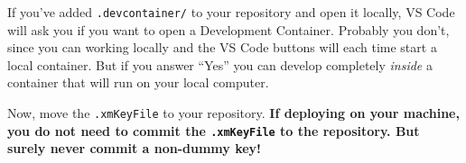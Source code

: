 \documentclass{ximera}
\begin{document}
\begin{warning}
    If you've added \verb!.devcontainer/! to your repository and open it
    locally, VS Code will ask you if you want to open a Development Container.
    Probably you don't, since you can working locally and the VS Code buttons will each time start a local container.
    But if you answer ``Yes'' you can develop completely \textit{inside} a container that will run on your local computer. 
\end{warning}

Now, move the \verb!.xmKeyFile! to your repository.
\textbf{If deploying on your machine, you do not need to commit the
    \texttt{.xmKeyFile} to the repository. But surely never commit a non-dummy key!}
\end{document}
